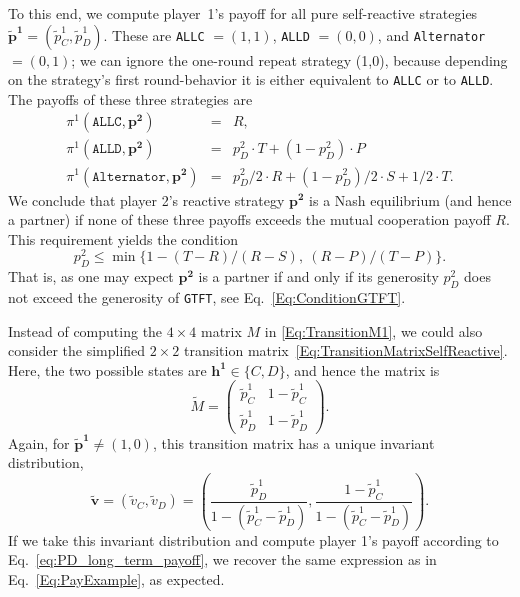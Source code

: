 \documentclass[11pt]{article}
\theoremstyle{plainCl1}
\theoremstyle{plainCl2}
\def\gtft{\texttt{GTFT}}
\def\allc{\texttt{ALLC}}
\def\alld{\texttt{ALLD}}
\def\alt{\texttt{Alternator}}
\begin{document}
To this end, we compute player~1's payoff for all pure self-reactive strategies $\mathbf{\tilde p^1}\!=\!(\tilde p^1_C, \tilde p^1_D)$. 
These are \allc{} $=\! (1,1)$, \alld{} $=\!(0,0)$, and \alt{} $=\!(0,1)$; we can ignore the one-round repeat strategy (1,0), because depending on the strategy's first round-behavior it is either equivalent to \allc{} or to \alld{}. The payoffs of these three strategies are
\begin{equation}
\begin{array}{rcl}
\pi^1(\allc,\mathbf{p^2}) &= &R,\\[0.2cm]
\pi^1(\alld,\mathbf{p^2}) &= &p^2_D \!\cdot \!T +(1\!-\!p^2_D) \!\cdot\!P\\[0.2cm]
\pi^1(\alt,\mathbf{p^2})	&=	& p^2_D/2\!\cdot\!R + (1\!-\!p^2_D)/2\!\cdot\!S + 1/2\!\cdot\! T.
\end{array}
\end{equation}
We conclude that player 2's reactive strategy $\mathbf{p^2}$ is a Nash equilibrium (and hence a partner) if none of these three payoffs exceeds the mutual cooperation payoff $R$. This requirement yields the condition
\begin{equation}
p^2_D \le \min\big\{1\!-\!(T\!-\!R)/(R\!-\!S),~(R\!-\!P)/(T\!-\!P)\big\}.
\end{equation}
That is, as one may expect $\mathbf{p^2}$ is a partner if and only if its generosity $p^2_D$ does not exceed the generosity of \gtft, see Eq.~\eqref{Eq:ConditionGTFT}. 

Instead of computing the $4\times4$ matrix $M$ in \eqref{Eq:TransitionM1}, we could also consider the simplified $2\!\times\!2$ transition matrix~\eqref{Eq:TransitionMatrixSelfReactive}. Here, the two possible states are $\mathbf{h^1}\!\in\!\{C,D\}$, and hence the matrix is
\begin{equation}
\tilde{M} = \left(
\begin{array}{cc}
\tilde{p}^1_C	&1\!-\!\tilde p^1_C\\
\tilde p^1_D	&1\!-\!\tilde p^1_D
\end{array}
\right). 
\end{equation}
Again, for $\mathbf{\tilde p^1} \!\neq\! (1,0)$, this transition matrix has a unique invariant distribution,
\begin{equation}
\mathbf{\tilde v} = (\tilde v_C, \tilde v_D) = \left( \frac{\tilde p^1_D}{1-({\tilde p^1_C} - {\tilde p^1_D})}, \frac{1\!-\!\tilde p^1_C}{1-({\tilde p^1_C} - {\tilde p^1_D})} \right).
\end{equation}
If we take this invariant distribution and compute player 1's payoff according to Eq.~\eqref{eq:PD_long_term_payoff}, we recover the same expression as in Eq.~\eqref{Eq:PayExample}, as expected.
\end{document}
